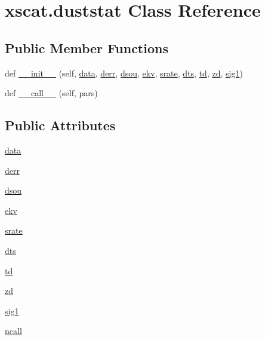 \hypertarget{classxscat_1_1duststat}{}\section{xscat.\+duststat Class Reference}
\label{classxscat_1_1duststat}
\subsection*{Public Member Functions}
\begin{DoxyCompactItemize}
\item 
def \hyperlink{classxscat_1_1duststat_a11bd2557a5be1c5a3bb92d411ed755d3}{\+\_\+\+\_\+init\+\_\+\+\_\+} (self, \hyperlink{classxscat_1_1duststat_a0a7cbb517da1955d48a4fa62d92fb089}{data}, \hyperlink{classxscat_1_1duststat_a69e21938c11f72d93d2d72b92a703fb1}{derr}, \hyperlink{classxscat_1_1duststat_a3ceb607b156398c43411e816e3689c11}{dsou}, \hyperlink{classxscat_1_1duststat_a569ccfbf191380b99f322424965f7b6c}{ekv}, \hyperlink{classxscat_1_1duststat_a1582446fa6681c67b5b016551f134ff5}{srate}, \hyperlink{classxscat_1_1duststat_ad44f5ef84d5e58805c8aa07920f68de4}{dts}, \hyperlink{classxscat_1_1duststat_abbaecc521acf76189ea5248e78c5c5bb}{td}, \hyperlink{classxscat_1_1duststat_a0a7849280f4e35de134ff34f829df531}{zd}, \hyperlink{classxscat_1_1duststat_af0f6ae620b94499708636bacd203e7dd}{sig1})
\item 
def \hyperlink{classxscat_1_1duststat_a8db8ce37288e515751d744f72840fdea}{\+\_\+\+\_\+call\+\_\+\+\_\+} (self, pars)
\end{DoxyCompactItemize}
\subsection*{Public Attributes}
\begin{DoxyCompactItemize}
\item 
\hyperlink{classxscat_1_1duststat_a0a7cbb517da1955d48a4fa62d92fb089}{data}
\item 
\hyperlink{classxscat_1_1duststat_a69e21938c11f72d93d2d72b92a703fb1}{derr}
\item 
\hyperlink{classxscat_1_1duststat_a3ceb607b156398c43411e816e3689c11}{dsou}
\item 
\hyperlink{classxscat_1_1duststat_a569ccfbf191380b99f322424965f7b6c}{ekv}
\item 
\hyperlink{classxscat_1_1duststat_a1582446fa6681c67b5b016551f134ff5}{srate}
\item 
\hyperlink{classxscat_1_1duststat_ad44f5ef84d5e58805c8aa07920f68de4}{dts}
\item 
\hyperlink{classxscat_1_1duststat_abbaecc521acf76189ea5248e78c5c5bb}{td}
\item 
\hyperlink{classxscat_1_1duststat_a0a7849280f4e35de134ff34f829df531}{zd}
\item 
\hyperlink{classxscat_1_1duststat_af0f6ae620b94499708636bacd203e7dd}{sig1}
\item 
\hyperlink{classxscat_1_1duststat_a1a7455fed5f32b4d1b265faaf0695467}{ncall}
\end{DoxyCompactItemize}



